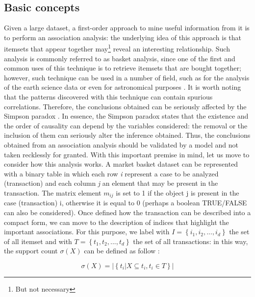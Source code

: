 \documentclass[12pt,%
               a4paper,%
               oneside,openany,%
               titlepage,%
               headinclude,footinclude,%
               BCOR5mm,%
               cleardoublepage=empty,%
               tablecaptionabove,%
               floatperchapter,
               ]{scrreprt}                 %
\begin{document}
\subsection{Basic concepts}

Given a large dataset, a first-order approach to mine useful information from it is to perform an association analysis: the underlying idea of this approach is that itemsets that appear together may\footnote{But not necessary} reveal an interesting relationship. Such analysis is commonly referred to as basket analysis, since one of the first and common uses of this technique is to retrieve itemsets that are bought together; however, such technique can be used in a number of field, such as for the analysis of the earth science data or even for astronomical purposes \cite{borah2019rare}. It is worth noting that the patterns discovered with this technique can contain spurious correlations. Therefore, the conclusions obtained can be seriously affected by the Simpson paradox \cite{simpson1951interpretation,blyth1972simpson}. In essence, the Simpson paradox states that the existence and the order of causality can depend by the variables considered: the removal or the inclusion of them can seriously alter the inference obtained. Thus, the conclusions obtained from an association analysis should be validated by a model and not taken recklessly for granted. With this important premise in mind, let us move to consider how this analysis works. A market basket dataset can be represented with a binary table in which each row \textit{i} represent a case to be analyzed (transaction) and each column \textit{j} an element that may be present in the transaction. The matrix element $ m_{ij} $ is set to 1 if the object j is present in the case (transaction) i, otherwise it is equal to 0 (perhaps a boolean TRUE/FALSE can also be considered). Once defined how the transaction can be described into a compact form, we can move to the description of indices that highlight the important associations. For this purpose, we label with $I=\left\lbrace i_{1},i_{2},...,i_{d} \right\rbrace$ the set of all itemset and with $T=\left\lbrace t_{1},t_{2},...,t_{d} \right\rbrace$ the set of all transactions: in this way, the support count $\sigma(X)$ can be defined as follow \cite{tan2019introduction}:

\begin{equation}
\sigma(X)= \left| \left\lbrace t_{i} | X \subseteq t_{i}, t_{i} \in T \right\rbrace \right|
\end{equation}
\end{document}
